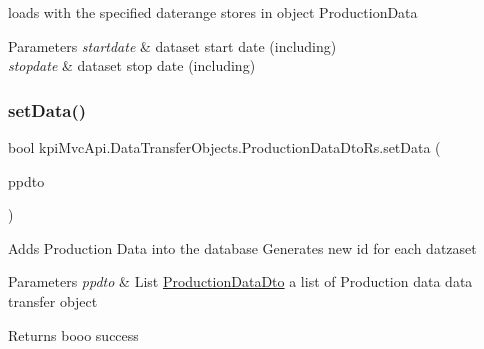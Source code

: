 loads with the specified daterange stores in object {\ttfamily  Production\+Data } 


\begin{DoxyParams}{Parameters}
{\em startdate} & dataset start date (including)\\
\hline
{\em stopdate} & dataset stop date (including)\\
\hline
\end{DoxyParams}
\mbox{\label{classkpi_mvc_api_1_1_data_transfer_objects_1_1_production_data_dto_rs_a403a889d4d7b6dbc5ddd07e85c660892}} 
\subsubsection{\texorpdfstring{set\+Data()}{setData()}\hspace{0.1cm}{\footnotesize\ttfamily [1/2]}}
{\footnotesize\ttfamily bool kpi\+Mvc\+Api.\+Data\+Transfer\+Objects.\+Production\+Data\+Dto\+Rs.\+set\+Data (\begin{DoxyParamCaption}\item[{List$<$ \hyperlink{classkpi_mvc_api_1_1_data_transfer_objects_1_1_production_data_dto}{Production\+Data\+Dto} $>$}]{ppdto }\end{DoxyParamCaption})\hspace{0.3cm}{\ttfamily [inline]}}



Adds Production Data into the database Generates new id for each datzaset 


\begin{DoxyParams}{Parameters}
{\em ppdto} & {\ttfamily  List \hyperlink{classkpi_mvc_api_1_1_data_transfer_objects_1_1_production_data_dto}{Production\+Data\+Dto} } a list of Production data data transfer object \\
\hline
\end{DoxyParams}
\begin{DoxyReturn}{Returns}
{\ttfamily booo} success
\end{DoxyReturn}
\mbox{\label{classkpi_mvc_api_1_1_data_transfer_objects_1_1_production_data_dto_rs_a403a889d4d7b6dbc5ddd07e85c660892}} 
